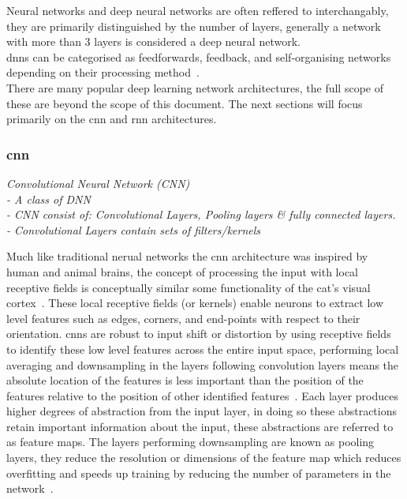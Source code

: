 \documentclass[11pt]{article}
\begin{document}
Neural networks and deep neural networks are often reffered to interchangably, they are primarily distinguished by the number of layers, generally a network with more than 3 layers is considered a deep neural network.\\

\Acrshort{dnn}s can be categorised as feedforwards, feedback, and self-organising networks depending on their processing method~\autocite{chenDeepLearningMobile2020}.\\

There are many popular deep learning network architectures, the full scope of these are beyond the scope of this document. The next sections will focus primarily on the \Acrshort{cnn} and \Acrshort{rnn} architectures.



\subsubsection{\Acrlong*{cnn}}
\emph{
    Convolutional Neural Network (CNN)\\
    - A class of DNN\\
    - CNN consist of: Convolutional Layers, Pooling layers \& fully connected layers.\\
    - Convolutional Layers contain sets of filters/kernels
}

Much like traditional nerual networks the \Acrshort{cnn} architecture was inspired by human and animal brains, the concept of processing the input with local receptive fields is conceptually similar some functionality of the cat's visual cortex~\autocite{hubelReceptiveFieldsBinocular1962,lecunConvolutionalNetworksImages,pouyanfarSurveyDeepLearning2019}. 
These local receptive fields (or kernels) enable neurons to extract low level features such as edges, corners, and end-points with respect to their orientation. \Acrshort{cnn}s are robust to input shift or distortion by using receptive fields to identify these low level features across the entire input space, performing local averaging and downsampling in the layers following convolution layers means the absolute location of the features is less important than the position of the features relative to the position of other identified features~\autocite{lecunConvolutionalNetworksImages}. Each layer produces higher degrees of abstraction from the input layer, in doing so these abstractions retain important information about the input, these abstractions are referred to as feature maps.
The layers performing downsampling are known as pooling layers, they reduce the resolution or dimensions of the feature map which reduces overfitting and speeds up training by reducing the number of parameters in the network~\autocite{pouyanfarSurveyDeepLearning2019}.\\
\end{document}
